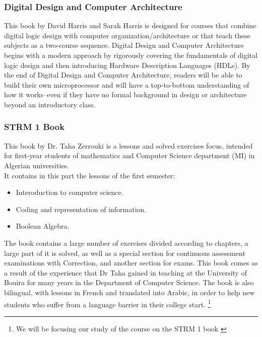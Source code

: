  \subsubsection{Digital Design and Computer Architecture }
This book by David Harris and Sarah Harris is designed for courses that combine digital logic design with computer organization/architecture or that teach these subjects
as a two-course sequence. Digital Design and Computer Architecture begins with a modern approach by rigorously covering the fundamentals
of digital logic design and then introducing Hardware Description Languages (HDLs). By the end of Digital Design and Computer Architecture,
readers will be able to build their own microprocessor and will have a top-to-bottom understanding of how it works--even if they have no formal background
in design or architecture beyond an introductory class. \cite{harris2010digital}

\subsubsection{STRM 1 Book }
This book by Dr. Taha Zerrouki is a lessons and solved exercises focus, intended for first-year students of mathematics and Computer Science department (MI) in 
Algerian universities.\cite{STRM-1-Book-Taha-Zerrouki}\\
It contains in this part the lessons of the first semester:
\begin{itemize}
	\item Interoduction to computer science.
	\item Coding and representation of information.
	\item Boolean Algebra.
\end{itemize}
The book contains a large number of exercises divided according to chapters, a large part of it is solved, as well as a special section for continuous assessment examinations with
Correction, and another section for exams.
This book comes as a result of the experience that Dr Taha gained in teaching at the University of Bouira for many years in the Department of Computer Science.
The book is also bilingual, with lessons in French and translated into Arabic, in order to help new students who suffer from a language barrier in their college start.
\footnote{We will be focusing our study of the course on the STRM 1 book \cite{STRM-1-Book-Taha-Zerrouki}}



